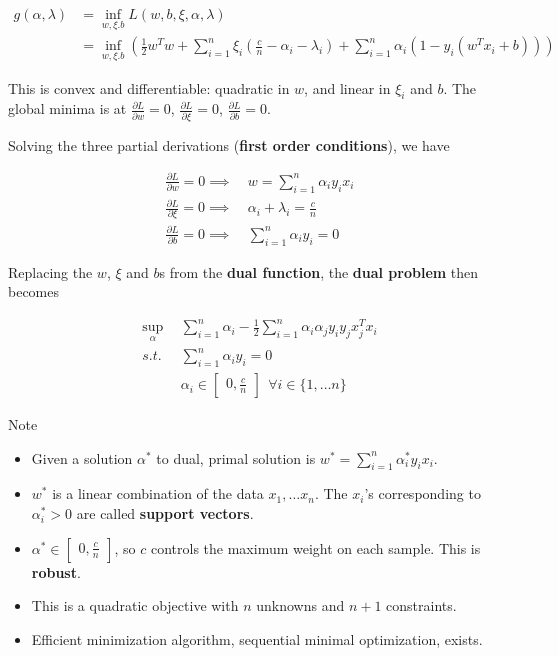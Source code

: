 \documentclass{article}
\DeclareMathOperator*{\minf}{inf}
\DeclareMathOperator*{\msup}{sup}
\begin{document}
\begin{align*}
g(\alpha, \lambda) &= \minf_{w, \xi. b} L(w, b, \xi, \alpha, \lambda) \\
                   &= \minf_{w, \xi. b} (\frac{1}{2} w^{T} w + \sum_{i = 1}^{n}{\xi_i (\frac{c}{n} - \alpha_i - \lambda_i)} + \sum_{i = 1}^{n}{\alpha_i (1 - y_i (w^{T} x_i + b))})
\end{align*}

This is convex and differentiable: quadratic in $w$, and linear in $\xi_i$ and $b$.
The global minima is at $\frac{\partial L}{\partial w} = 0$, $\frac{\partial L}{\partial \xi} = 0$, $\frac{\partial L}{\partial b} = 0$.

Solving the three partial derivations (\textbf{first order conditions}), we have

\begin{align*}
\frac{\partial L}{\partial w} = 0   \implies & ~w = \sum_{i = 1}^{n}{\alpha_i y_i x_i} \\
\frac{\partial L}{\partial \xi} = 0 \implies & ~\alpha_i + \lambda_i = \frac{c}{n} \\
\frac{\partial L}{\partial b} = 0   \implies & ~\sum_{i = 1}^{n}{\alpha_i y_i = 0}
\end{align*}

Replacing the $w$, $\xi$ and $b$s from the \textbf{dual function}, the \textbf{dual problem} then becomes

\begin{align*}
\msup_{\alpha} ~ ~ & \sum_{i = 1}^{n}{\alpha_i} - \frac{1}{2} \sum_{i = 1}^{n}{\alpha_i \alpha_j y_i y_j x_j^{T} x_i} \\
s.t.               & \sum_{i = 1}^{n}{\alpha_i y_i} = 0 \\
                   & \alpha_i \in \begin{bmatrix}0, \frac{c}{n}\end{bmatrix} ~ ~ \forall i \in \{1, \dots n\}
\end{align*}

Note
\begin{itemize}
  \item Given a solution $\alpha^*$ to dual, primal solution is $w^* = \sum_{i = 1}^{n}{\alpha_i^* y_i x_i}$.
  \item $w^*$ is a linear combination of the data $x_1, \dots x_n$. The $x_i$'s corresponding to $\alpha_i^* > 0$ are called \textbf{support vectors}.
  \item $\alpha^* \in \begin{bmatrix}0, \frac{c}{n}\end{bmatrix}$, so $c$ controls the maximum weight on each sample. This is \textbf{robust}.
  \item This is a quadratic objective with $n$ unknowns and $n + 1$ constraints.
  \item Efficient minimization algorithm, sequential minimal optimization, exists.
\end{itemize}
\end{document}

